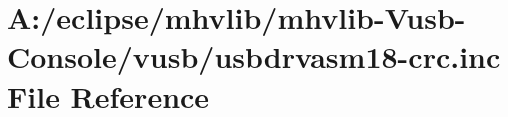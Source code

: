 \hypertarget{mhvlib-_vusb-_console_2vusb_2usbdrvasm18-crc_8inc}{\section{A\-:/eclipse/mhvlib/mhvlib-\/\-Vusb-\/\-Console/vusb/usbdrvasm18-\/crc.inc File Reference}
\label{mhvlib-_vusb-_console_2vusb_2usbdrvasm18-crc_8inc}
}
